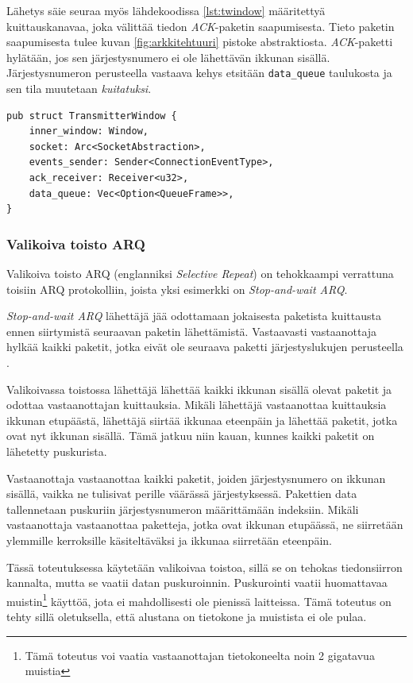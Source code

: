 \documentclass[a4paper,12pt]{article}
\begin{document}
Lähetys säie seuraa myös lähdekoodissa \ref{lst:twindow} määritettyä kuittauskanavaa, joka välittää tiedon \textit{ACK}-paketin saapumisesta. Tieto paketin saapumisesta tulee kuvan \ref{fig:arkkitehtuuri} pistoke abstraktiosta. \textit{ACK}-paketti hylätään, jos sen järjestysnumero ei ole lähettävän ikkunan sisällä. Järjestysnumeron perusteella vastaava kehys etsitään \lstinline{data_queue} taulukosta ja sen tila muutetaan \textit{kuitatuksi}. \par
    
    \begin{lstlisting}[caption={Lähettävän ikkunan rakenne}, label={lst:twindow}]
pub struct TransmitterWindow {
    inner_window: Window,
    socket: Arc<SocketAbstraction>,
    events_sender: Sender<ConnectionEventType>,
    ack_receiver: Receiver<u32>,
    data_queue: Vec<Option<QueueFrame>>,
}\end{lstlisting}

    \subsubsection{Valikoiva toisto ARQ}\label{subsec:valikoiva_toisto}
    Valikoiva toisto ARQ (englanniksi \textit{Selective Repeat}) on tehokkaampi verrattuna toisiin ARQ protokolliin, joista yksi esimerkki on \textit{Stop-and-wait ARQ}.

    \textit{Stop-and-wait ARQ} lähettäjä jää odottamaan jokaisesta paketista kuittausta ennen siirtymistä seuraavan paketin lähettämistä. Vastaavasti vastaanottaja hylkää kaikki paketit, jotka eivät ole seuraava paketti järjestyslukujen perusteella \cite{StopAndWaitARQ}.

    Valikoivassa toistossa lähettäjä lähettää kaikki ikkunan sisällä olevat paketit ja odottaa vastaanottajan kuittauksia. Mikäli lähettäjä vastaanottaa kuittauksia ikkunan etupäästä, lähettäjä siirtää ikkunaa eteenpäin ja lähettää paketit, jotka ovat nyt ikkunan sisällä. Tämä jatkuu niin kauan, kunnes kaikki paketit on lähetetty puskurista. \par

    Vastaanottaja vastaanottaa kaikki paketit, joiden järjestysnumero on ikkunan sisällä, vaikka ne tulisivat perille väärässä järjestyksessä. Pakettien data tallennetaan puskuriin järjestysnumeron määrittämään indeksiin. Mikäli vastaanottaja vastaanottaa paketteja, jotka ovat ikkunan etupäässä, ne siirretään ylemmille kerroksille käsiteltäväksi ja ikkunaa siirretään eteenpäin.

    Tässä toteutuksessa käytetään valikoivaa toistoa, sillä se on tehokas tiedonsiirron kannalta, mutta se vaatii datan puskuroinnin. Puskurointi vaatii huomattavaa muistin\footnote{Tämä toteutus voi vaatia vastaanottajan tietokoneelta noin 2 gigatavua muistia} käyttöä, jota ei mahdollisesti ole pienissä laitteissa. Tämä toteutus on tehty sillä oletuksella, että alustana on tietokone ja muistista ei ole pulaa.\par
\end{document}
